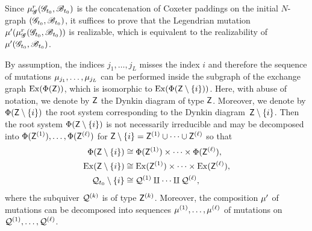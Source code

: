Since $\mu_\mathscr{G}^r(\mathscr{G}_{t_0}, \mathscr{B}_{t_0})$ is the concatenation of Coxeter paddings on the initial $N$-graph $(\mathscr{G}_{t_0},\mathscr{B}_{t_0})$, it suffices to prove that the Legendrian mutation
$\mu'(\mu_\mathscr{G}^r(\mathscr{G}_{t_0}, \mathscr{B}_{t_0}))$
is realizable, which is equivalent to the realizability of
$\mu'(\mathscr{G}_{t_0}, \mathscr{B}_{t_0})$.

By assumption, the indices $j_1,\dots, j_L$ misses the index $i$ and therefore the sequence of mutations $\mu_{j_1},\dots,\mu_{j_L}$ can be performed inside the subgraph of the exchange graph $\operatorname{Ex}(\Phi(\mathsf{Z}))$, which is isomorphic to $\operatorname{Ex}(\Phi(\mathsf{Z} \setminus \{i\}))$.
Here, with abuse of notation, we denote by $\mathsf{Z}$ the Dynkin diagram of type $\mathsf{Z}$. Moreover, we denote by $\Phi(\mathsf{Z} \setminus \{i\})$ the root system corresponding to the Dynkin diagram~$\mathsf{Z} \setminus \{i\}$. 
Then the root system $\Phi(\mathsf{Z}\setminus \{i\})$ is not necessarily irreducible and may be decomposed into $\Phi(\mathsf{Z}^{(1)}), \dots, \Phi(\mathsf{Z}^{(\ell)})$ for $\mathsf{Z}\setminus\{i\} = \mathsf{Z}^{(1)}\cup\cdots\cup\mathsf{Z}^{(\ell)}$ so that
\begin{align*}
\Phi(\mathsf{Z}\setminus\{i\}) &\cong
\Phi(\mathsf{Z}^{(1)})\times\cdots\times\Phi(\mathsf{Z}^{(\ell)}),\\
\operatorname{Ex}(\mathsf{Z}\setminus\{i\}) &\cong
\operatorname{Ex}(\mathsf{Z}^{(1)})\times\cdots\times\operatorname{Ex}(\mathsf{Z}^{(\ell)}),\\
\mathcal{Q}_{t_0}\setminus\{i\}&\cong \mathcal{Q}^{(1)}\amalg\cdots\amalg\mathcal{Q}^{(\ell)},
\end{align*}
where the subquiver $\mathcal{Q}^{(k)}$ is of type $\mathsf{Z}^{(k)}$.
Moreover, the composition $\mu'$ of mutations can be decomposed into sequences $\mu^{(1)},\dots, \mu^{(\ell)}$ of mutations on $\mathcal{Q}^{(1)},\dots,\mathcal{Q}^{(\ell)}$.

